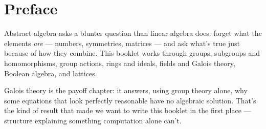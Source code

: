 \chapter*{Preface}

Abstract algebra asks a blunter question than linear algebra
does: forget what the elements \textit{are} --- numbers, symmetries,
matrices --- and ask what's true just because of how they combine. This
booklet works through groups, subgroups and homomorphisms, group
actions, rings and ideals, fields and Galois theory, Boolean algebra,
and lattices.

Galois theory is the payoff chapter: it answers, using group theory
alone, why some equations that look perfectly reasonable have no
algebraic solution. That's the kind of result that made we want to
write this booklet in the first place --- structure explaining
something computation alone can't.

